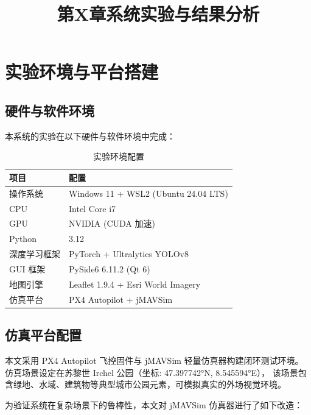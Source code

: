 \documentclass[12pt, a4paper]{ctexart}
\title{第X章\quad 系统实验与结果分析}
\author{}
\date{}
\begin{document}
\maketitle
\thispagestyle{empty}

\section{实验环境与平台搭建}
\label{sec:env}

\subsection{硬件与软件环境}

本系统的实验在以下硬件与软件环境中完成：

\begin{table}[H]
\centering
\caption{实验环境配置}
\label{tab:env}
\begin{tabular}{ll}
\toprule
\textbf{项目} & \textbf{配置} \\
\midrule
操作系统 & Windows 11 + WSL2 (Ubuntu 24.04 LTS) \\
CPU & Intel Core i7 \\
GPU & NVIDIA (CUDA 加速) \\
Python & 3.12 \\
深度学习框架 & PyTorch + Ultralytics YOLOv8 \\
GUI 框架 & PySide6 6.11.2 (Qt 6) \\
地图引擎 & Leaflet 1.9.4 + Esri World Imagery \\
仿真平台 & PX4 Autopilot + jMAVSim \\
\bottomrule
\end{tabular}
\end{table}

\subsection{仿真平台配置}

本文采用 PX4 Autopilot 飞控固件与 jMAVSim 轻量仿真器构建闭环测试环境。
仿真场景设定在苏黎世 Irchel 公园（坐标: 47.397742°N, 8.545594°E），
该场景包含绿地、水域、建筑物等典型城市公园元素，可模拟真实的外场视觉环境。

为验证系统在复杂场景下的鲁棒性，本文对 jMAVSim 仿真器进行了如下改造：
\end{document}
